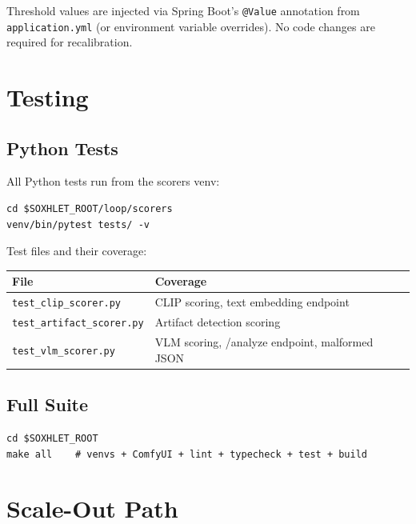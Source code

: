 \documentclass[11pt,letterpaper]{article}
\begin{document}
Threshold values are injected via Spring Boot's \texttt{@Value} annotation from
\texttt{application.yml} (or environment variable overrides).
No code changes are required for recalibration.

\section{Testing}

\subsection{Python Tests}

All Python tests run from the scorers venv:

\begin{lstlisting}[style=shell]
cd $SOXHLET_ROOT/loop/scorers
venv/bin/pytest tests/ -v
\end{lstlisting}

Test files and their coverage:

\begin{center}
\begin{tabular}{ll}
\toprule
\textbf{File} & \textbf{Coverage} \\
\midrule
\texttt{test\_clip\_scorer.py}     & CLIP scoring, text embedding endpoint \\
\texttt{test\_artifact\_scorer.py} & Artifact detection scoring \\
\texttt{test\_vlm\_scorer.py}      & VLM scoring, /analyze endpoint, malformed JSON \\
\bottomrule
\end{tabular}
\end{center}

\subsection{Full Suite}

\begin{lstlisting}[style=shell]
cd $SOXHLET_ROOT
make all    # venvs + ComfyUI + lint + typecheck + test + build
\end{lstlisting}

\section{Scale-Out Path}
\end{document}
